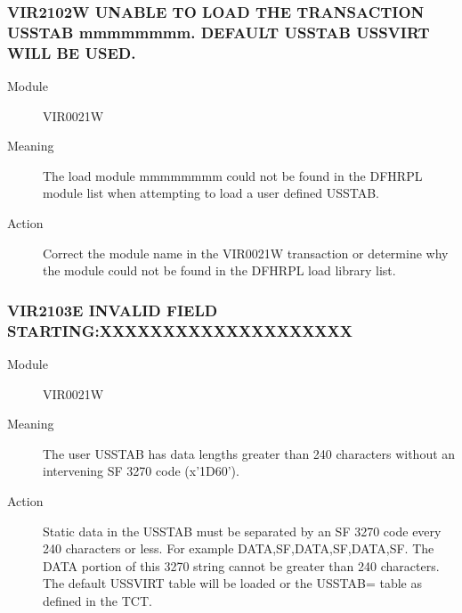 \documentclass[letterpaper,10pt,english]{sphinxmanual}
\begin{document}
\subsubsection{VIR2102W UNABLE TO LOAD THE TRANSACTION USSTAB mmmmmmmm. DEFAULT USSTAB USSVIRT WILL BE USED.}
\label{\detokenize{messages:vir2102w-unable-to-load-the-transaction-usstab-mmmmmmmm-default-usstab-ussvirt-will-be-used}}\begin{description}
\item[{Module}] \leavevmode
VIR0021W

\item[{Meaning}] \leavevmode
The load module mmmmmmmm could not be found in the DFHRPL module list when attempting to load a user defined USSTAB.

\item[{Action}] \leavevmode
Correct the module name in the VIR0021W transaction or determine why the module could not be found in the DFHRPL load library list.

\end{description}


\subsubsection{VIR2103E INVALID FIELD STARTING:XXXXXXXXXXXXXXXXXXXX}
\label{\detokenize{messages:vir2103e-invalid-field-starting-xxxxxxxxxxxxxxxxxxxx}}\begin{description}
\item[{Module}] \leavevmode
VIR0021W

\item[{Meaning}] \leavevmode
The user USSTAB has data lengths greater than 240 characters without an intervening SF 3270 code (x’1D60’).

\item[{Action}] \leavevmode
Static data in the USSTAB must be separated by an SF 3270 code every 240 characters or less. For example DATA,SF,DATA,SF,DATA,SF. The DATA portion of this 3270 string cannot be greater than 240 characters. The default USSVIRT table will be loaded or the USSTAB= table as defined in the TCT.

\end{description}
\end{document}
